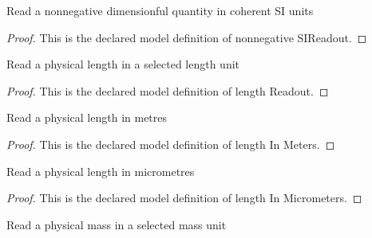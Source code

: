 \begin{definition}
  \label{def:physics:phyx-mini-0654:phyxminiproblems-problemphyxmini0654-nonnegativesireadout}
  Read a nonnegative dimensionful quantity in coherent SI units
\end{definition}
\begin{proof}
  This is the declared model definition of nonnegative SIReadout.
\end{proof}
\begin{definition}
  \label{def:physics:phyx-mini-0654:phyxminiproblems-problemphyxmini0654-lengthreadout}
  Read a physical length in a selected length unit
\end{definition}
\begin{proof}
  This is the declared model definition of length Readout.
\end{proof}
\begin{definition}
  \label{def:physics:phyx-mini-0654:phyxminiproblems-problemphyxmini0654-lengthinmeters}
  Read a physical length in metres
\end{definition}
\begin{proof}
  This is the declared model definition of length In Meters.
\end{proof}
\begin{definition}
  \label{def:physics:phyx-mini-0654:phyxminiproblems-problemphyxmini0654-lengthinmicrometers}
  Read a physical length in micrometres
\end{definition}
\begin{proof}
  This is the declared model definition of length In Micrometers.
\end{proof}
\begin{definition}
  \label{def:physics:phyx-mini-0654:phyxminiproblems-problemphyxmini0654-massreadout}
  Read a physical mass in a selected mass unit
\end{definition}
